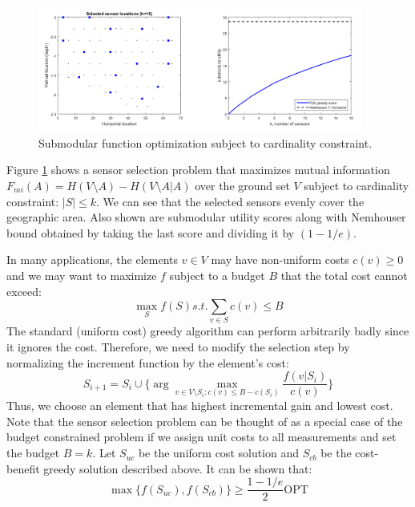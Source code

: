 \begin{figure}[tbhp]
    \centering
    \includegraphics[width=0.95\textwidth, trim={10 10 10 10}]{figures/sfo_sensors_merged.png}
    \caption{Submodular function optimization subject to cardinality constraint.}
    \label{fig:sensors_merged}
\end{figure}

Figure \ref{fig:sensors_merged} shows a sensor selection problem that maximizes mutual information $F_{mi}(A) = H(V\setminus A) - H(V\setminus A | A)$ over the ground set $V$ subject to cardinality constraint: $|S| \leq k$. We can see that the selected sensors evenly cover the geographic area. Also shown are submodular utility scores along with Nemhouser bound obtained by taking the last score and dividing it by $(1-1/e)$.    

In many applications, the elements $v \in V$ may have non-uniform costs $c(v)\geq 0$ and we may want to maximize $f$ subject to a budget $B$ that the total cost cannot exceed:
\begin{equation}
    \max_S f(S) s.t. \sum_{v \in S} c(v) \leq B
\end{equation}
The standard (uniform cost) greedy algorithm can perform arbitrarily badly since it ignores the cost. Therefore, we need to modify the selection step by normalizing the increment function by the element's cost:
\begin{equation}
    S_{i+1} = S_i \cup \bigg\{ \arg \max_{v \in V\setminus S_i : c(v)\leq B-c(S_i)} \frac{f(v|S_i)}{c(v)} \bigg\}
\end{equation}
Thus, we choose an element that has highest incremental gain and lowest cost. Note that the sensor selection problem can be thought of as a special case of the budget constrained problem if we assign unit costs to all measurements and set the budget $B=k$. Let $S_{uc}$ be the uniform cost solution and $S_{cb}$ be the cost-benefit greedy solution described above. It can be shown that:
\begin{equation}
    \max\{f(S_{uc}),f(S_{cb})\} \geq \frac{1-1/e}{2}\mathrm{OPT} 
\end{equation}

